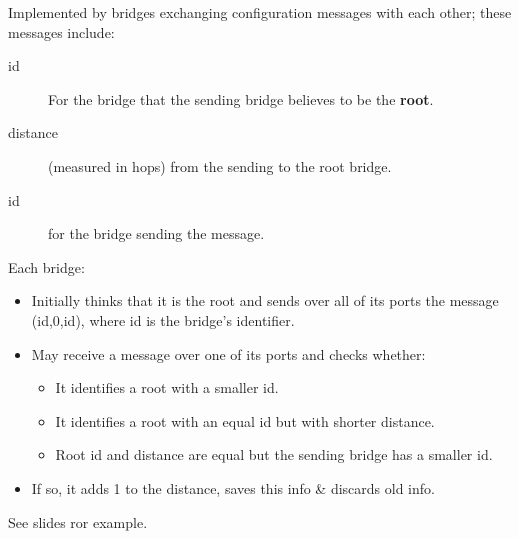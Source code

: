 \documentclass[11pt]{article}
\begin{document}
Implemented by bridges exchanging configuration messages with each other; these messages include:
\begin{description}
\item[{id}] For the bridge that the sending bridge believes to be the \textbf{root}.
\item[{distance}] (measured in hops) from the sending to the root bridge.
\item[{id}] for the bridge sending the message.
\end{description}
Each bridge:
\begin{itemize}
\item Initially thinks that it is the root and sends over all of its ports the message (id,0,id), where id is the bridge's identifier.
\item May receive a message over one of its ports and checks whether:
\begin{itemize}
\item It identifies a root with a smaller id.
\item It identifies a root with an equal id but with shorter distance.
\item Root id and distance are equal but the sending bridge has a smaller id.
\end{itemize}
\item If so, it adds 1 to the distance, saves this info \& discards old info.
\end{itemize}
See slides ror example.
\end{document}
